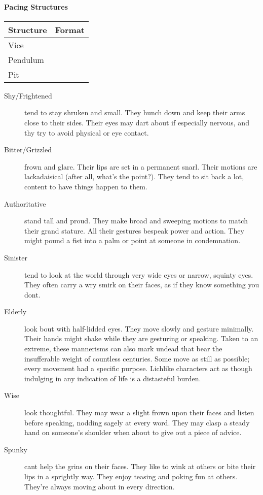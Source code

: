 \paragraph{Pacing Structures}
\begin{tabular}{l l}
    Structure & Format \\
    \hline
    Vice & \\
    Pendulum & \\
    Pit & \\
    
\end{tabular}

\begin{description}
  \item[Shy/Frightened] tend to stay shruken and small. They hunch down and keep their arms close to their sides. Their eyes may dart about if especially nervous, and thy try to avoid physical or eye contact.
  \item[Bitter/Grizzled] frown and glare. Their lips are set in a permanent snarl. Their motions are lackadaisical (after all, what's the point?). They tend to sit back a lot, content to have things happen to them.
  \item[Authoritative] stand tall and proud. They make broad and sweeping motions to match their grand stature. All their gestures bespeak power and action. They might pound a fist into a palm or point at someone in condemnation.
  \item[Sinister] tend to look at the world through very wide eyes or narrow, squinty eyes. They often carry a wry smirk on their faces, as if they know something you dont.
  \item[Elderly] look bout with half-lidded eyes. They move slowly and gesture minimally. Their hands might shake while they are gesturing or speaking. Taken to an extreme, these mannerisms can also mark undead that bear the insufferable weight of countless centuries. Some move as still as possible; every movement had a specific purpose. Lichlike characters act as though indulging in any indication of life is a distasteful burden. 
  \item[Wise] look thoughtful. They may wear a slight frown upon their faces and listen before speaking, nodding sagely at every word. They may clasp a steady hand on someone's shoulder when about to give out a piece of advice. 
  \item[Spunky] cant help the grins on their faces. They like to wink at others or bite their lips in a sprightly way. They enjoy teasing and poking fun at others. They're always moving about in every direction.

\end{description}

